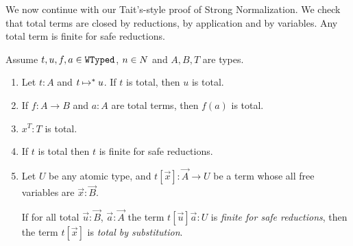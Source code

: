 %
%
%

We now continue with our Tait's-style proof of Strong Normalization.
We check that total terms are closed by reductions, by application and by variables.
Any total term is finite for safe reductions.



\begin{lemma}\label{lem:total_value-finiteness}
Assume $t,u,f,a \in {\tt WTyped}$, $n \in {N}$ and $A,B,T$ are types.

  \begin{enumerate}
  \item
\label{lem:total_value-finiteness1}
    Let $t:A$ and $t \mathbin{\mapsto}^{*} u$.
    If $t$ is total, then $u$ is total.

  \item
\label{lem:total_value-finiteness2}
    If $f:A \rightarrow B$ and $a:A$ are total terms, then $f(a)$ is total.

  \item
\label{lem:total_value-finiteness2bis}
    $x^T:T$ is total.

 \item
\label{lem:total_value-finiteness2ter}
  If $t$ is total then $t$ is  finite for safe reductions.

  \item
\label{lem:total_value-finiteness3}
    Let $U$ be any atomic type, and $t[\vec{x}]:\vec{A}\rightarrow U$ be a term
    whose all free variables are $\vec{x}:\vec{B}$.

    If for all total $\vec{u}:\vec{B}$, $\vec{a}:\vec{A}$ the term 
    $t[\vec{u}]\vec{a}: U$ is \emph{finite for safe reductions}, then
    the term $t[\vec{x}]$ is \emph{total by substitution}.
  \end{enumerate}

\end{lemma}

